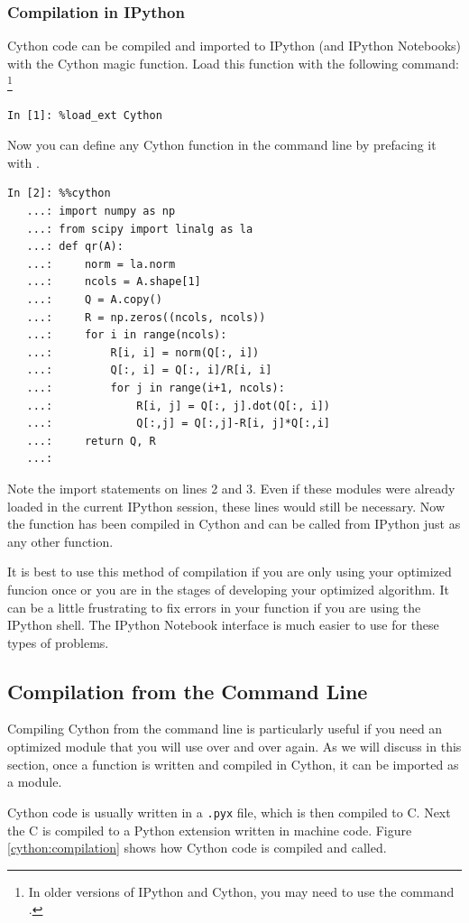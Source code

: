 \subsubsection*{Compilation in IPython}
Cython code can be compiled and imported to IPython (and IPython Notebooks) with the Cython magic function.
Load this function with the following command:
\footnote{In older versions of IPython and Cython, you may need to use the command .}
\begin{lstlisting}
In [1]: %load_ext Cython
\end{lstlisting}
Now you can define any Cython function in the command line by prefacing it with .
\begin{lstlisting}
In [2]: %%cython
   ...: import numpy as np
   ...: from scipy import linalg as la
   ...: def qr(A):
   ...:     norm = la.norm
   ...:     ncols = A.shape[1]
   ...:     Q = A.copy()
   ...:     R = np.zeros((ncols, ncols))
   ...:     for i in range(ncols):
   ...:         R[i, i] = norm(Q[:, i])
   ...:         Q[:, i] = Q[:, i]/R[i, i]
   ...:         for j in range(i+1, ncols):
   ...:             R[i, j] = Q[:, j].dot(Q[:, i])
   ...:             Q[:,j] = Q[:,j]-R[i, j]*Q[:,i]
   ...:     return Q, R
   ...:
\end{lstlisting}
Note the import statements on lines 2 and 3. Even if these modules were already loaded in the current IPython session, these lines would still be necessary. Now the  function has been compiled in Cython and can be called from IPython just as any other function. 

It is best to use this method of compilation if you are only using your optimized funcion once or you are in the stages of developing your optimized algorithm. It can be a little frustrating to fix errors in your function if you are using the IPython shell. The IPython Notebook interface is much easier to use for these types of problems.

\subsection*{Compilation from the Command Line}
Compiling Cython from the command line is particularly useful if you need an optimized module that you will use over and over again. As we will discuss in this section, once a function is written and compiled in Cython, it can be imported as a module.

Cython code is usually written in a \texttt{.pyx} file, which is then compiled to C.
Next the C is compiled to a Python extension written in machine code.
Figure \ref{cython:compilation} shows how Cython code is compiled and called.

